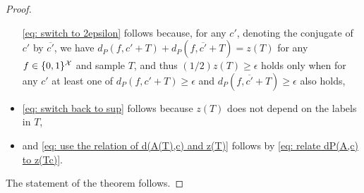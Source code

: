 \begin{proof}
\begin{itemize}
\eqref{eq: switch to 2epsilon} follows
because, for any $c'$, denoting the conjugate of $c'$ by $\overline{c'}$, we have
\(
  d_P\left(f,c'+{T} \right) 
  +
  d_P\left(f,\overline{c'}+{T} \right)
  =
  z\left({T}\right)
\)
for any $f \in \{0,1\}^{\mathcal{X}}$ and sample $T$, and thus $(1/2)z(T) \geq \epsilon$ holds only when for any $c'$ at least one of $d_P\left(f,c'+{T} \right) \geq \epsilon$ and $d_P\left(f,\overline{c'}+{T} \right) \geq \epsilon$ also holds,
\item
\eqref{eq: switch back to sup} follows because $z(T)$ does not depend on the labels in $T$,
\item
and \eqref{eq: use the relation of d(A(T),c) and z(T)} follows by \eqref{eq: relate dP(A,c) to z(Tc)}.
\end{itemize}
The statement of the theorem follows.
\end{proof}
